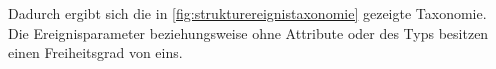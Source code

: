 Dadurch ergibt sich die in \autoref{fig:strukturereignistaxonomie} gezeigte Taxonomie. Die Ereignisparameter beziehungsweise  ohne Attribute oder des Typs  besitzen einen Freiheitsgrad von eins.


